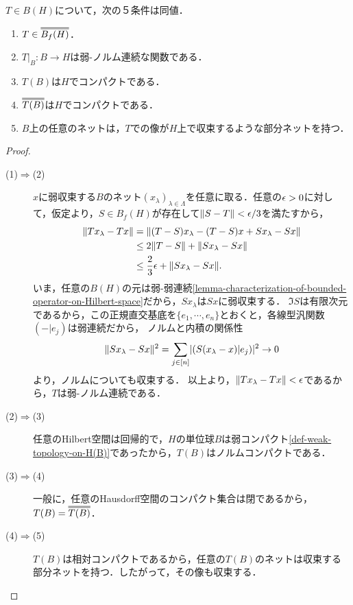 \documentclass[uplatex,dvipdfmx]{jsreport}
\begin{document}
\begin{theorem}
    $T\in B(H)$について，次の５条件は同値．
    \begin{enumerate}
        \item $T\in\dbloverline{B_f(H)}$．
        \item $T|_B:B\to H$は弱-ノルム連続な関数である．
        \item $T(B)$は$H$でコンパクトである．
        \item $\dbloverline{T(B)}$は$H$でコンパクトである．
        \item $B$上の任意のネットは，$T$での像が$H$上で収束するような部分ネットを持つ．
    \end{enumerate}
\end{theorem}
\begin{proof}\mbox{}
    \begin{description}
        \item[(1)$\Rightarrow$(2)] 
        $x$に弱収束する$B$のネット$(x_\lambda)_{\lambda\in\Lambda}$を任意に取る．任意の$\epsilon>0$に対して，仮定より，$S\in B_f(H)$が存在して$\|S-T\|<\epsilon/3$を満たすから，
        \begin{align*}
            \|Tx_\lambda-Tx\|&=\|(T-S)x_\lambda-(T-S)x+Sx_\lambda-Sx\|\\
            &\le2\|T-S\|+\|Sx_\lambda-Sx\|\\
            &\le\frac{2}{3}\epsilon+\|Sx_\lambda-Sx\|.
        \end{align*}
        いま，任意の$B(H)$の元は弱-弱連続\ref{lemma-characterization-of-bounded-operator-on-Hilbert-space}だから，$Sx_\lambda$は$Sx$に弱収束する．
        $\Im S$は有限次元であるから，この正規直交基底を$\{e_1,\cdots,e_n\}$とおくと，各線型汎関数$(-|e_j)$は弱連続だから，
        ノルムと内積の関係性
        \[\|Sx_\lambda-Sx\|^2=\sum_{j\in[n]}\lvert(S(x_\lambda-x)|e_j)\rvert^2\to0\]
        より，ノルムについても収束する．
        以上より，$\|Tx_\lambda-Tx\|<\epsilon$であるから，$T$は弱-ノルム連続である．
        \item[(2)$\Rightarrow$(3)]
        任意のHilbert空間は回帰的で，$H$の単位球$B$は弱コンパクト\ref{def-weak-topology-on-H(B)}であったから，$T(B)$はノルムコンパクトである．
        \item[(3)$\Rightarrow$(4)]
        一般に，任意のHausdorff空間のコンパクト集合は閉であるから，$T(B)=\oo{T(B)}$．
        \item[(4)$\Rightarrow$(5)]
        $T(B)$は相対コンパクトであるから，任意の$T(B)$のネットは収束する部分ネットを持つ．したがって，その像も収束する．

\end{description}
\end{proof}
\end{document}
